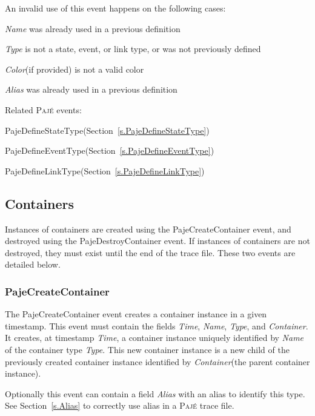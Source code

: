 \documentclass[12pt]{article}
\newcommand{\Paje}{\textsc{Paj\'e}\xspace}
\newcommand{\PajeField}[1]{\emph{#1}\xspace}
\newcommand{\Time}{\PajeField{Time}}
\newcommand{\Name}{\PajeField{Name}}
\newcommand{\Type}{\PajeField{Type}}
\newcommand{\Container}{\PajeField{Container}}
\newcommand{\Alias}{\PajeField{Alias}}
\newcommand{\Color}{\PajeField{Color}}
\newcommand{\PajeEvent}[1]{\textsf{#1}\xspace}
\newcommand{\PajeDefineStateType}{\PajeEvent{PajeDefineStateType}}
\newcommand{\PajeDefineEventType}{\PajeEvent{PajeDefineEventType}}
\newcommand{\PajeDefineLinkType}{\PajeEvent{PajeDefineLinkType}}
\newcommand{\PajeCreateContainer}{\PajeEvent{PajeCreateContainer}}
\newcommand{\PajeDestroyContainer}{\PajeEvent{PajeDestroyContainer}}
\newenvironment{itemize*}%
               {\vspace{-1em}
                 \begin{itemize}%
                   \setlength{\itemsep}{0pt}%
                   \setlength{\parskip}{0pt}}%
               {\end{itemize}}
\begin{document}
An invalid use of this event happens on the following cases:
\begin{itemize*}
\item \Name was already used in a previous definition
\item \Type is not a state, event, or link type, or was not previously defined
\item \Color (if provided) is not a valid color
\item \Alias was already used in a previous definition
\end{itemize*}

Related \Paje events:
\begin{itemize*}
\item \PajeDefineStateType (Section~\ref{s.PajeDefineStateType})
\item \PajeDefineEventType (Section~\ref{s.PajeDefineEventType})
\item \PajeDefineLinkType (Section~\ref{s.PajeDefineLinkType})
\end{itemize*}

\subsection{Containers}
Instances of containers are created using the \PajeCreateContainer
event, and destroyed using the \PajeDestroyContainer event. If
instances of containers are not destroyed, they must exist until the
end of the trace file. These two events are detailed below.

\subsubsection{PajeCreateContainer}
\label{s.PajeCreateContainer}
The \PajeCreateContainer event creates a container instance in a given
timestamp. This event must contain the fields \Time, \Name, \Type, and
\Container. It creates, at timestamp \Time, a container instance
uniquely identified by \Name of the container type \Type. This new
container instance is a new child of the previously created container
instance identified by \Container (the parent container instance).

Optionally this event can contain a field \Alias with an alias to
identify this type. See Section~\ref{s.Alias} to correctly use alias
in a \Paje trace file.
\end{document}
